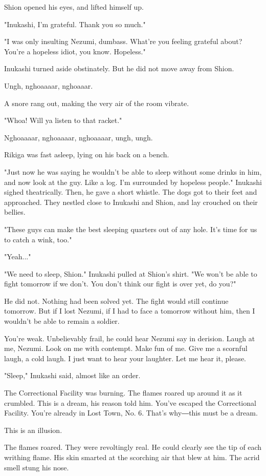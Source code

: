 Shion opened his eyes, and lifted himself up.

"Inukashi, I'm grateful. Thank you so much."

"I was only insulting Nezumi, dumbass. What're you feeling grateful
about? You're a hopeless idiot, you know. Hopeless."

Inukashi turned aside obstinately. But he did not move away from Shion.

Ungh, nghoaaaar, nghoaaar.

A snore rang out, making the very air of the room vibrate.

"Whoa! Will ya listen to that racket."

Nghoaaaar, nghoaaaar, nghoaaaar, ungh, ungh.

Rikiga was fast asleep, lying on his back on a bench.

"Just now he was saying he wouldn't be able to sleep without some drinks
in him, and now look at the guy. Like a log. I'm surrounded by hopeless
people." Inukashi sighed theatrically. Then, he gave a short whistle.
The dogs got to their feet and approached. They nestled close to
Inukashi and Shion, and lay crouched on their bellies.

"These guys can make the best sleeping quarters out of any hole. It's
time for us to catch a wink, too."

"Yeah..."

"We need to sleep, Shion." Inukashi pulled at Shion's shirt. "We won't
be able to fight tomorrow if we don't. You don't think our fight is over
yet, do you?"

He did not. Nothing had been solved yet. The fight would still continue
tomorrow. But if I lost Nezumi, if I had to face a tomorrow without him,
then I wouldn't be able to remain a soldier.

You're weak. Unbelievably frail, he could hear Nezumi say in derision.
Laugh at me, Nezumi. Look on me with contempt. Make fun of me. Give me a
scornful laugh, a cold laugh. I just want to hear your laughter. Let me
hear it, please.

"Sleep," Inukashi said, almost like an order.

The Correctional Facility was burning. The flames roared up around it as
it crumbled. This is a dream, his reason told him. You've escaped the
Correctional Facility. You're already in Lost Town, No. 6. That's
why―this must be a dream.

This is an illusion.

The flames roared. They were revoltingly real. He could clearly see the
tip of each writhing flame. His skin smarted at the scorching air that
blew at him. The acrid smell stung his nose.

